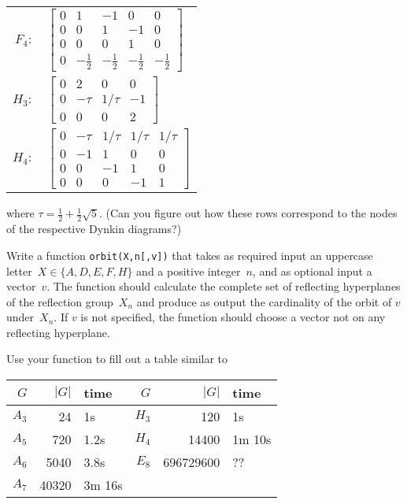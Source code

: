 \documentclass[11pt]{amsart}
\begin{document}
\begin{enumerate}
\begin{multicols}{2}
  \qquad\begin{tabular}[c]{rl}
  $F_4:$      
    &\small
    $\begin{bmatrix}
     0 & 1 & -1 & 0 & 0 \\
     0 & 0 & 1 & -1 & 0 \\
     0 & 0 & 0 & 1 & 0 \\
     0 & -\frac12 & -\frac12 & -\frac12 & -\frac12      
    \end{bmatrix}$
    \\[6ex]
    $H_3:$      
    &\small
    $\begin{bmatrix}
      0 & 2 & 0 & 0 \\
      0 & -\tau & 1/\tau & -1 \\
      0 & 0 & 0 & 2      
    \end{bmatrix}$
    \\[6ex]
    $H_4:$      
    &\small
    $\begin{bmatrix}
      0 & -\tau & 1/\tau & 1/\tau & 1/\tau \\
      0 & -1 & 1 & 0 & 0 \\
      0 & 0 & -1 & 1 & 0 \\
      0 & 0 & 0 & -1 & 1      
    \end{bmatrix}$
  \end{tabular}
\end{multicols}

\noindent where $\tau = \frac12 + \frac12\sqrt{5}$. (Can you figure out how these rows correspond to the nodes of the respective Dynkin diagrams?)

  Write a function \texttt{orbit(X,n[,v])} that takes as required input an uppercase letter~$X\in\{A,D,E,F,H\}$ and a positive integer~$n$, and as optional input a vector~$v$. The function should calculate the complete set of reflecting hyperplanes of the reflection group~$X_n$ and produce as output the cardinality of the orbit of $v$ under~$X_n$. If $v$ is not specified, the function should choose a vector not on any reflecting hyperplane.

Use your function to fill out a table similar to
\begin{center}
  \begin{tabular}[c]{r|r|l||r|r|l}
    $G$ & $|G|$ & time & $G$ & $|G|$ & time\\\hline
    $A_3$ & 24 & 1s & $H_3$ & 120 & 1s\\
    $A_5$ & 720 & 1.2s & $H_4$ & 14400 & 1m 10s\\
    $A_6$ & 5040 & 3.8s & $E_8$ & 696729600 & ?? \\
    $A_7$ & 40320 & 3m 16s
  \end{tabular}
\end{center}


\end{enumerate}
\end{document}

